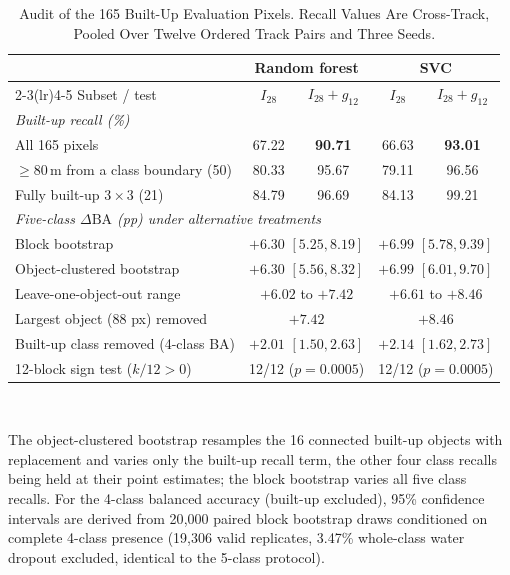 \begin{table}[!t]
\caption{Audit of the 165 Built-Up Evaluation Pixels. Recall Values Are Cross-Track, Pooled Over
Twelve Ordered Track Pairs and Three Seeds.}
\label{tab:labelaudit}\label{tab:builtup_audit}
\centering
\scriptsize
\setlength{\tabcolsep}{3pt}
\begin{tabular}{lcccc}
\toprule
& \multicolumn{2}{c}{Random forest} & \multicolumn{2}{c}{SVC} \\
\cmidrule(lr){2-3}\cmidrule(lr){4-5}
Subset / test & $I_{28}$ & $I_{28}{+}g_{12}$ & $I_{28}$ & $I_{28}{+}g_{12}$ \\
\midrule
\multicolumn{5}{l}{\emph{Built-up recall (\%)}} \\
All 165 pixels                          & 67.22 & \textbf{90.71} & 66.63 & \textbf{93.01} \\
$\geq 80$\,m from a class boundary (50) & 80.33 & 95.67 & 79.11 & 96.56 \\
Fully built-up $3\times3$ (21)          & 84.79 & 96.69 & 84.13 & 99.21 \\
\midrule
\multicolumn{5}{l}{\emph{Five-class $\Delta\text{BA}$ (pp) under alternative treatments}} \\
Block bootstrap    & \multicolumn{2}{c}{$+6.30$ $[5.25, 8.19]$} & \multicolumn{2}{c}{$+6.99$ $[5.78, 9.39]$} \\
Object-clustered bootstrap   & \multicolumn{2}{c}{$+6.30$ $[5.56, 8.32]$} & \multicolumn{2}{c}{$+6.99$ $[6.01, 9.70]$} \\
Leave-one-object-out range   & \multicolumn{2}{c}{$+6.02$ to $+7.42$}     & \multicolumn{2}{c}{$+6.61$ to $+8.46$} \\
Largest object (88 px) removed & \multicolumn{2}{c}{$+7.42$}              & \multicolumn{2}{c}{$+8.46$} \\
Built-up class removed (4-class BA) & \multicolumn{2}{c}{$+2.01$ $[1.50, 2.63]$} & \multicolumn{2}{c}{$+2.14$ $[1.62, 2.73]$} \\
12-block sign test ($k/12 > 0$)     & \multicolumn{2}{c}{12/12 ($p = 0.0005$)} & \multicolumn{2}{c}{12/12 ($p = 0.0005$)} \\
\bottomrule
\end{tabular}
\\[2pt]
\parbox{\columnwidth}{\footnotesize The object-clustered bootstrap resamples the 16 connected built-up objects with replacement and varies only the built-up recall term, the other four class recalls being held at their point estimates; the block bootstrap varies all five class recalls. For the 4-class balanced accuracy (built-up excluded), 95\% confidence intervals are derived from 20{,}000 paired block bootstrap draws conditioned on complete 4-class presence (19{,}306 valid replicates, 3.47\% whole-class water dropout excluded, identical to the 5-class protocol).}
\end{table}



